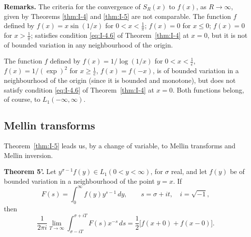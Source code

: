 \noindent\textbf{Remarks.}
The criteria for the convergence of $S_R(x)$ to $f(x)$, as $R\to\infty$, given by Theorems \ref{thm:I-4} and \ref{thm:I-5} are not comparable. The function $f$ defined by $f(x)=x\sin(1/x)$ for $0<x<\frac1\pi$; $f(x)=0$ for $x\le 0$; $f(x)=0$ for $x>\frac1\pi$; satisfies condition \eqref{eq:I-4.6} of Theorem~\ref{thm:I-4} at $x=0$, but it is not of bounded variation in any neighbourhood of the origin.

The function $f$ defined by $f(x)=1/\log(1/x)$ for $0<x<\frac1e$, $f(x)=1/(\exp)^2$ for $x\ge\frac1e$, $f(x)=f(-x)$, is of bounded variation in a neighbourhood of the origin (since it is bounded and monotone), but does not satisfy condition \eqref{eq:I-4.6} of Theorem~\ref{thm:I-4} at $x=0$. Both functions belong, of course, to $L_1(-\infty,\infty)$.

\subsection*{Mellin transforms}
Theorem~\ref{thm:I-5} leads us, by a change of variable, to Mellin transforms and Mellin inversion.

\noindent\textbf{Theorem 5'.}
Let $y^{\sigma-1}f(y)\in L_1(0<y<\infty)$, for $\sigma$ real, and let $f(y)$ be of bounded variation in a neighbourhood of the point $y=x$. If
\begin{equation}\label{eq:I-4.8}
F(s)=\int_0^\infty f(y)y^{s-1}\,dy,
\qquad s=\sigma+it,\quad i=\sqrt{-1},
\end{equation}
then
\begin{equation}\label{eq:I-4.9}
\frac{1}{2\pi i}\lim_{T\to\infty}\int_{\sigma-iT}^{\sigma+iT}F(s)x^{-s}\,ds
=\frac12\bigl[f(x+0)+f(x-0)\bigr].
\end{equation}

